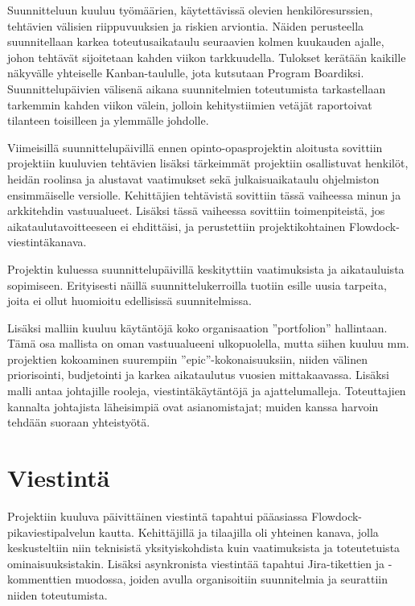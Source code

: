 \documentclass{article}
\begin{document}
Suunnitteluun kuuluu työmäärien, käytettävissä olevien henkilöresurssien,
tehtävien välisien riippuvuuksien ja riskien arviontia. Näiden perusteella
suunnitellaan karkea toteutusaikataulu seuraavien kolmen kuukauden ajalle,
johon tehtävät sijoitetaan kahden viikon tarkkuudella.  Tulokset kerätään
kaikille näkyvälle yhtei\-selle Kanban-taululle, jota kutsutaan Program
Boardiksi. Suunnittelupäivien välisenä aikana suunnitelmien toteutumista
tarkastellaan tarkemmin kahden viikon välein, jolloin kehitystii\-mien
vetä\-jät raportoivat tilanteen toisilleen ja ylemmälle johdolle.

Viimeisillä suunnittelupäivillä ennen opinto-opasprojektin aloitusta sovittiin projektiin
kuuluvien tehtävien lisäk\-si tärkeimmät projektiin osallistuvat henkilöt,
heidän roolinsa ja alustavat vaatimukset sekä julkaisu\-aikataulu ohjelmiston
ensimmäiselle versiolle. Kehittäjien tehtävistä sovittiin tässä vaiheessa minun
ja arkkitehdin vastuualueet. Lisäksi tässä vaiheessa sovittiin toimenpiteistä,
jos aikataulutavoitteeseen ei ehdittäisi, ja perustettiin projektikohtainen
Flowdock-viestintäkanava.

Projektin kuluessa suunnittelupäivillä keskityttiin vaatimuksista ja
aikatauluista sopimiseen. Erityi\-sesti näillä suunnittelukerroilla tuotiin
esille uusia tarpeita, joita ei ollut huomioitu edellisissä suunnitelmissa.

Lisäksi malliin kuuluu käytäntöjä koko organisaation ''portfolion'' hallintaan.
Tämä osa mallista on oman vastuualueeni ulkopuolella, mutta siihen kuuluu mm.
projektien kokoaminen suurempiin ''epic''-kokonaisuuksiin, niiden välinen
priorisointi, budjetointi ja karkea aikataulutus vuosien mittakaavassa. Lisäksi
malli antaa johtajille rooleja, vies\-tintäkäytäntöjä ja ajattelumalleja.
Toteuttajien kannalta johtajista läheisimpiä ovat asianomistajat; muiden kanssa
harvoin tehdään suoraan yhteistyötä.

\section{Viestintä}

Projektiin kuuluva päivittäinen viestintä tapahtui pääasiassa
Flowdock-pikaviestipalvelun kautta. Kehittäjillä ja tilaajilla oli yhteinen
kanava, jolla keskusteltiin niin teknisistä yksityiskohdista kuin vaatimuksista
ja toteutetuista ominaisuuksistakin. Lisäksi asynkronista viestintää tapahtui
Jira-tikettien ja -kommenttien muodossa, joiden avulla organisoitiin
suunnitelmia ja seurattiin niiden toteutumista.
\end{document}
